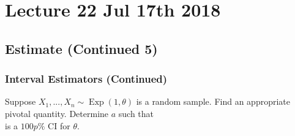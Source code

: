 \documentclass[notoc,notitlepage]{tufte-book}
\DeclareMathOperator{\Exp}{Exp }
\begin{document}



\chapter{Lecture 22 Jul 17th 2018}%
\label{chp:lecture_22_jul_17th_2018}

\section{Estimate (Continued 5)}%
\label{sec:estimate_continued_5}

\subsection{Interval Estimators (Continued)}%
\label{sub:interval_estimators_continued}

\begin{eg}[Example 6.21]
  Suppose $X_1, ..., X_n \sim \Exp(1, \theta)$ is a random sample. Find an appropriate pivotal quantity. Determine $a$ such that
  \begin{equation*}
    [ \hat{\theta} - a, \, \hat{\theta} ]
  \end{equation*}
  is a $100p\%$ CI for $\theta$.
\end{eg}
\end{document}
